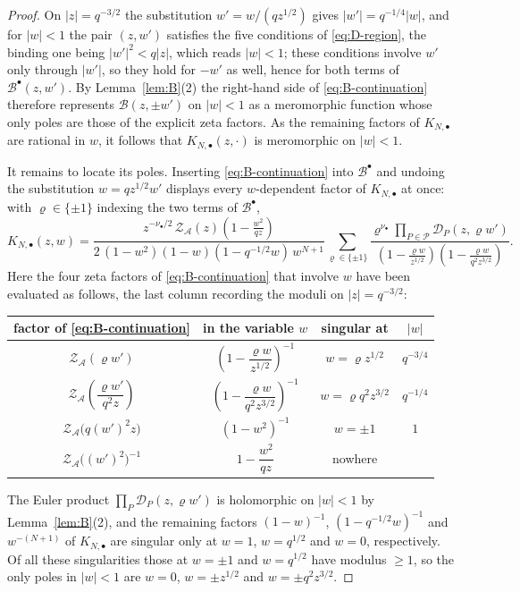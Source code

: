 \documentclass[a4paper,reqno]{amsart}
\numberwithin{equation}{section}
\theoremstyle{remark}
\theoremstyle{definition}
\newcommand{\A}{\mathcal{A}}
\begin{document}
\begin{proof}
On $|z|=q^{-3/2}$ the substitution $w'=w/(qz^{1/2})$ gives
$|w'|=q^{-1/4}|w|$, and for $|w|<1$ the pair $(z,w')$ satisfies the five
conditions of \eqref{eq:D-region}, the binding one being $|w'|^2<q|z|$,
which reads $|w|<1$; these conditions involve $w'$ only through $|w'|$, so
they hold for $-w'$ as well, hence for both terms of
$\mathcal B^{\bullet}(z,w')$. By Lemma~\ref{lem:B}(2) the right-hand side of
\eqref{eq:B-continuation} therefore represents $\mathcal B(z,\pm w')$ on
$|w|<1$ as a meromorphic function whose only poles are those of the explicit
zeta factors. As the remaining factors of $K_{N,\bullet}$ are rational in
$w$, it follows that $K_{N,\bullet}(z,\cdot)$ is meromorphic on $|w|<1$.

It remains to locate its poles. Inserting \eqref{eq:B-continuation} into
$\mathcal B^{\bullet}$ and undoing the substitution $w=qz^{1/2}w'$ displays
every $w$-dependent factor of $K_{N,\bullet}$ at once: with
$\varrho\in\{\pm1\}$ indexing the two terms of $\mathcal B^{\bullet}$,
$$
K_{N,\bullet}(z,w)
=
\frac{z^{-\nu_\bullet/2}\,\mathcal Z_{\A}(z)
\left(1-\frac{w^2}{qz}\right)}
{2\,(1-w^2)(1-w)(1-q^{-1/2}w)\,w^{N+1}}
\sum_{\varrho\in\{\pm1\}}
\frac{\varrho^{\nu_\bullet}
\prod_{P\in\mathcal P}\mathcal D_P(z,\varrho w')}
{\left(1-\frac{\varrho w}{z^{1/2}}\right)
\left(1-\frac{\varrho w}{q^2z^{3/2}}\right)}.
$$
Here the four zeta factors of \eqref{eq:B-continuation} that involve $w$
have been evaluated as follows, the last column recording the moduli on
$|z|=q^{-3/2}$:
\begin{center}
\renewcommand{\arraystretch}{1.4}
\begin{tabular}{c c c c}
factor of \eqref{eq:B-continuation} & in the variable $w$ & singular at &
$|w|$\\
\hline
$\mathcal Z_{\A}(\varrho w')$
& $\left(1-\dfrac{\varrho w}{z^{1/2}}\right)^{-1}$
& $w=\varrho z^{1/2}$
& $q^{-3/4}$\\

$\mathcal Z_{\A}\!\left(\dfrac{\varrho w'}{q^2z}\right)$
& $\left(1-\dfrac{\varrho w}{q^2z^{3/2}}\right)^{-1}$
& $w=\varrho q^2z^{3/2}$
& $q^{-1/4}$\\

$\mathcal Z_{\A}\bigl(q(w')^2z\bigr)$
& $\left(1-w^2\right)^{-1}$
& $w=\pm1$
& $1$\\

$\mathcal Z_{\A}\bigl((w')^2\bigr)^{-1}$
& $1-\dfrac{w^2}{qz}$
& nowhere
& \\
\end{tabular}
\end{center}
The Euler product $\prod_P\mathcal D_P(z,\varrho w')$ is holomorphic on
$|w|<1$ by Lemma~\ref{lem:B}(2), and the remaining factors $(1-w)^{-1}$,
$(1-q^{-1/2}w)^{-1}$ and $w^{-(N+1)}$ of $K_{N,\bullet}$ are singular only
at $w=1$, $w=q^{1/2}$ and $w=0$, respectively. Of all these singularities
those at $w=\pm1$ and $w=q^{1/2}$ have modulus $\ge1$, so the only poles in
$|w|<1$ are $w=0$, $w=\pm z^{1/2}$ and $w=\pm q^{2}z^{3/2}$.
\end{proof}
\end{document}
